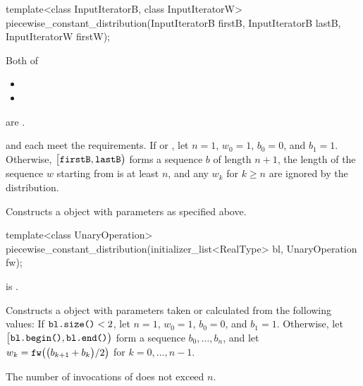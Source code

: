 %
\begin{itemdecl}
template<class InputIteratorB, class InputIteratorW>
  piecewise_constant_distribution(InputIteratorB firstB, InputIteratorB lastB,
                                  InputIteratorW firstW);
\end{itemdecl}

\begin{itemdescr}
\pnum
\mandates
Both of
\begin{itemize}
\item{}
\item{}
\end{itemize}
are .

\pnum
\expects
   and 
   each meet the
   requirements.
 If 
 or ,
 let $n = 1$,
     $w_0 = 1$,
     $b_0 = 0$,
 and $b_1 = 1$.
 Otherwise,
 $\bigl[\tcode{firstB}, \tcode{lastB}\bigr)$
 forms a sequence $b$ of length $n+1$,
 the length of the sequence $w$ starting from 
 is at least $n$,
 and any $w_k$ for  $k \geq n$ are ignored by the distribution.

\pnum
\effects
Constructs a  object
 with parameters as specified above.
\end{itemdescr}


%
\begin{itemdecl}
template<class UnaryOperation>
  piecewise_constant_distribution(initializer_list<RealType> bl, UnaryOperation fw);
\end{itemdecl}

\begin{itemdescr}
\pnum
\mandates
{} is .

\pnum
\effects
Constructs a  object
 with parameters taken or calculated
 from the following values:
 If $\tcode{bl.size()} < 2$,
 let $n = 1$,
     $w_0 = 1$,
     $b_0 = 0$,
 and $b_1 = 1$.
 Otherwise,
 let $\bigl[\tcode{bl.begin()}, \tcode{bl.end()}\bigr)$
 form a sequence $b_0, \dotsc, b_n$,
 and
 let $w_k = \tcode{fw}\bigl(\bigl(b_{k+1} + b_k\bigr) / 2\bigr)$
 for $k = 0, \dotsc, n - 1$.

\pnum
\complexity
The number of invocations of  does not exceed $n$.
\end{itemdescr}


